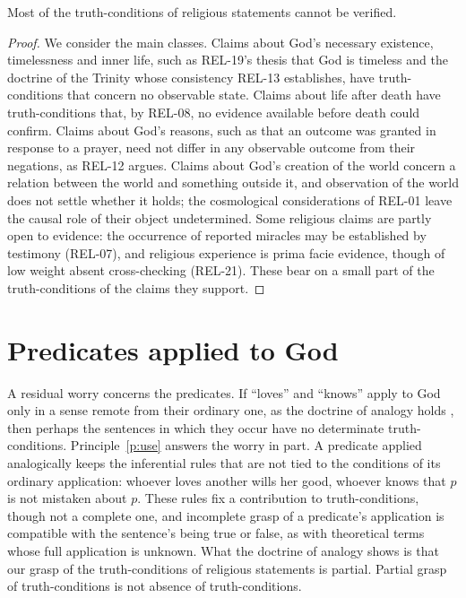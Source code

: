 \documentclass{situationist-preprint}
\begin{document}
\begin{proposition}\label{p:most}
Most of the truth-conditions of religious statements cannot be verified.
\end{proposition}

\begin{proof}
We consider the main classes. Claims about God's necessary existence, timelessness and inner life, such as REL-19's thesis that God is timeless and the doctrine of the Trinity whose consistency REL-13 establishes, have truth-conditions that concern no observable state. Claims about life after death have truth-conditions that, by REL-08, no evidence available before death could confirm. Claims about God's reasons, such as that an outcome was granted in response to a prayer, need not differ in any observable outcome from their negations, as REL-12 argues. Claims about God's creation of the world concern a relation between the world and something outside it, and observation of the world does not settle whether it holds; the cosmological considerations of REL-01 leave the causal role of their object undetermined. Some religious claims are partly open to evidence: the occurrence of reported miracles may be established by testimony (REL-07), and religious experience is prima facie evidence, though of low weight absent cross-checking (REL-21). These bear on a small part of the truth-conditions of the claims they support.
\end{proof}

\section{Predicates applied to God}

A residual worry concerns the predicates. If \enquote{loves} and \enquote{knows} apply to God only in a sense remote from their ordinary one, as the doctrine of analogy holds \citep[I, q.~13]{AquinasST}, then perhaps the sentences in which they occur have no determinate truth-conditions. Principle~\ref{p:use} answers the worry in part. A predicate applied analogically keeps the inferential rules that are not tied to the conditions of its ordinary application: whoever loves another wills her good, whoever knows that $p$ is not mistaken about $p$. These rules fix a contribution to truth-conditions, though not a complete one, and incomplete grasp of a predicate's application is compatible with the sentence's being true or false, as with theoretical terms whose full application is unknown. What the doctrine of analogy shows is that our grasp of the truth-conditions of religious statements is partial. Partial grasp of truth-conditions is not absence of truth-conditions.
\end{document}
